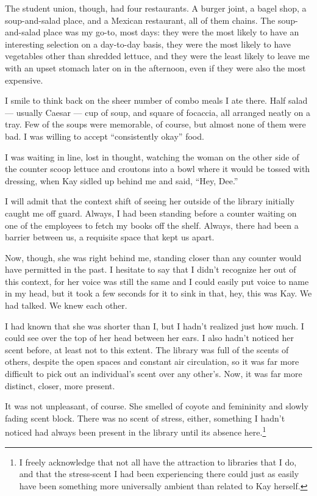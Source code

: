 The student union, though, had four restaurants. A burger joint, a bagel shop, a soup-and-salad place, and a Mexican restaurant, all of them chains. The soup-and-salad place was my go-to, most days: they were the most likely to have an interesting selection on a day-to-day basis, they were the most likely to have vegetables other than shredded lettuce, and they were the least likely to leave me with an upset stomach later on in the afternoon, even if they were also the most expensive.

I smile to think back on the sheer number of combo meals I ate there. Half salad --- usually Caesar --- cup of soup, and square of focaccia, all arranged neatly on a tray. Few of the soups were memorable, of course, but almost none of them were bad. I was willing to accept ``consistently okay'' food.

I was waiting in line, lost in thought, watching the woman on the other side of the counter scoop lettuce and croutons into a bowl where it would be tossed with dressing, when Kay sidled up behind me and said, ``Hey, Dee.''

I will admit that the context shift of seeing her outside of the library initially caught me off guard. Always, I had been standing before a counter waiting on one of the employees to fetch my books off the shelf. Always, there had been a barrier between us, a requisite space that kept us apart.

Now, though, she was right behind me, standing closer than any counter would have permitted in the past. I hesitate to say that I didn't recognize her out of this context, for her voice was still the same and I could easily put voice to name in my head, but it took a few seconds for it to sink in that, hey, this was Kay. We had talked. We knew each other.

I had known that she was shorter than I, but I hadn't realized just how much. I could see over the top of her head between her ears. I also hadn't noticed her scent before, at least not to this extent. The library was full of the scents of others, despite the open spaces and constant air circulation, so it was far more difficult to pick out an individual's scent over any other's. Now, it was far more distinct, closer, more present.

It was not unpleasant, of course. She smelled of coyote and femininity and slowly fading scent block. There was no scent of stress, either, something I hadn't noticed had always been present in the library until its absence here.\footnote{I freely acknowledge that not all have the attraction to libraries that I do, and that the stress-scent I had been experiencing there could just as easily have been something more universally ambient than related to Kay herself.}

